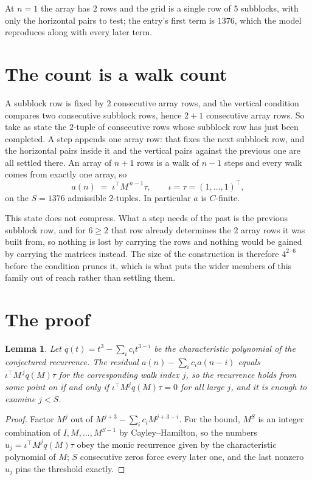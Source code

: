 \documentclass[11pt,a4paper]{article}
\theoremstyle{plain}
\newtheorem{lemma}[theorem]{Lemma}
\theoremstyle{definition}
\begin{document}
At $n=1$ the array has $2$ rows and the grid is a single row of $5$
subblocks, with only the horizontal pairs to test; the entry's first term is
$1376$, which the model reproduces along with every later term.

\section{The count is a walk count}

A subblock row is fixed by $2$ consecutive array rows, and the vertical condition compares
two consecutive subblock rows, hence $2+1$ consecutive array rows. So take as state the
$2$-tuple of consecutive rows whose subblock row has just been completed. A step appends one
array row: that fixes the next subblock row, and the horizontal pairs inside it and the
vertical pairs against the previous one are all settled there. An array of $n+1$ rows is
a walk of $n-1$ steps and every walk comes from exactly one array, so
\[
a(n)\;=\;\iota^{\!\top}M^{\,n-1}\tau,\qquad\iota=\tau=(1,\dots,1)^{\!\top},
\]
on the $S=1376$ admissible $2$-tuples. In particular $a$ is $C$-finite.

This state does not compress. What a step needs of the past is the previous subblock row, and
for $6\ge2$ that row already determines the $2$ array rows it was built from, so nothing
is lost by carrying the rows and nothing would be gained by carrying the matrices instead. The
size of the construction is therefore $4^{2\cdot6}$ before the condition prunes
it, which is what puts the wider members of this family out of reach rather than settling them.

\section{The proof}

\begin{lemma}\label{lem:crit}
Let $q(t)=t^{3}-\sum_i c_it^{3-i}$ be the characteristic polynomial of the
conjectured recurrence. The residual $a(n)-\sum_ic_ia(n-i)$ equals
$\iota^{\!\top}M^{\,j}q(M)\tau$ for the corresponding walk index $j$, so the recurrence
holds from some point on if and only if $\iota^{\!\top}M^{j}q(M)\tau=0$ for all large $j$,
and it is enough to examine $j<S$.
\end{lemma}

\begin{proof}
Factor $M^{j}$ out of $M^{j+3}-\sum_ic_iM^{j+3-i}$. For the bound, $M^{S}$
is an integer combination of $I,M,\dots,M^{S-1}$ by Cayley--Hamilton, so the numbers
$u_j=\iota^{\!\top}M^{j}q(M)\tau$ obey the monic recurrence given by the characteristic
polynomial of $M$; $S$ consecutive zeros force every later one, and the last nonzero $u_j$
pins the threshold exactly.
\end{proof}
\end{document}
